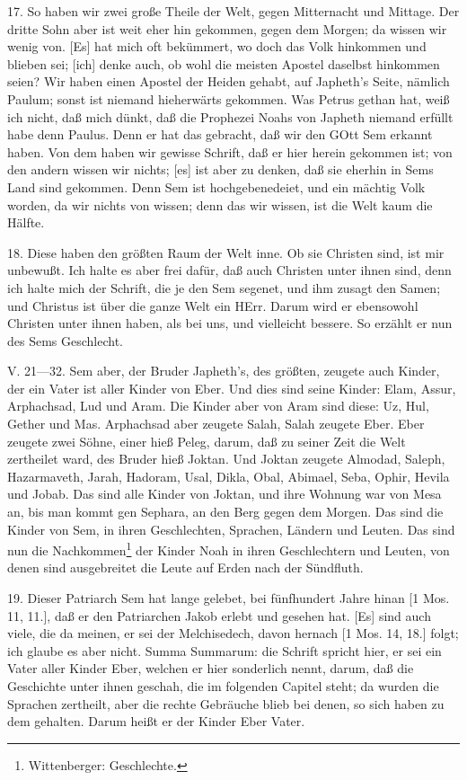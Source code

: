 17. So haben wir zwei große Theile der Welt, gegen Mitternacht und Mittage. Der
dritte Sohn aber ist weit eher hin gekommen, gegen dem Morgen; da wissen wir wenig von. [Es] hat mich oft bekümmert, wo doch das Volk hinkommen und blieben sei; [ich] denke auch, ob wohl die meisten Apostel daselbst hinkommen seien? Wir haben einen Apostel der Heiden gehabt, auf Japheth's Seite, nämlich Paulum; sonst ist niemand hieherwärts gekommen. Was Petrus gethan hat, weiß ich nicht, daß mich dünkt, daß die Prophezei Noahs von Japheth niemand erfüllt habe denn Paulus. Denn er hat das gebracht, daß wir den GOtt Sem erkannt haben. Von dem haben wir gewisse Schrift, daß er hier herein gekommen ist; von den andern wissen wir nichts; [es] ist aber zu denken, daß sie eherhin in Sems Land sind gekommen. Denn Sem ist hochgebenedeiet, und ein mächtig Volk worden, da wir nichts von wissen; denn das wir wissen, ist die Welt kaum die Hälfte.

18. Diese haben den größten Raum der Welt inne. Ob sie Christen sind, ist mir unbewußt. Ich halte es aber frei dafür, daß auch Christen unter ihnen sind, denn ich halte mich der Schrift, die je den Sem segenet, und ihm zusagt den Samen; und Christus ist über die ganze Welt ein HErr. Darum wird er ebensowohl Christen unter ihnen haben, als bei uns, und vielleicht bessere. So erzählt er nun des Sems Geschlecht.

\begin{schriftzitat}
V. 21—32. Sem aber, der Bruder Japheth's, des größten, zeugete auch Kinder, der ein Vater ist aller Kinder von Eber. Und dies sind seine Kinder: Elam, Assur, Arphachsad, Lud und Aram. Die Kinder aber von Aram sind diese: Uz, Hul, Gether und Mas. Arphachsad aber zeugete Salah, Salah zeugete Eber. Eber zeugete zwei Söhne, einer hieß Peleg, darum, daß zu seiner Zeit die Welt zertheilet ward, des Bruder hieß Joktan. Und Joktan zeugete Almodad, Saleph, Hazarmaveth, Jarah, Hadoram, Usal, Dikla, Obal, Abimael, Seba, Ophir, Hevila und Jobab. Das sind alle Kinder von Joktan, und ihre Wohnung war von Mesa an, bis man kommt gen Sephara, an den Berg gegen dem Morgen. Das sind die Kinder von Sem, in ihren Geschlechten, Sprachen, Ländern und Leuten. Das sind nun die Nachkommen\footnote{Wittenberger: Geschlechte.} der Kinder Noah in ihren Geschlechtern und Leuten, von denen sind ausgebreitet die Leute auf Erden nach der Sündfluth.
\end{schriftzitat}

19. Dieser Patriarch Sem hat lange gelebet, bei fünfhundert Jahre hinan [1 Mos. 11, 11.], daß er den Patriarchen Jakob erlebt und gesehen hat. [Es] sind auch viele, die da meinen, er sei der Melchisedech, davon hernach [1 Mos. 14, 18.] folgt; ich glaube es aber nicht. Summa Summarum: die Schrift spricht hier, er sei ein Vater aller Kinder Eber, welchen er hier sonderlich nennt, darum, daß die Geschichte unter ihnen geschah, die im folgenden Capitel steht; da wurden die Sprachen zertheilt, aber die rechte Gebräuche blieb bei denen, so sich haben zu dem gehalten. Darum heißt er der Kinder Eber Vater.

